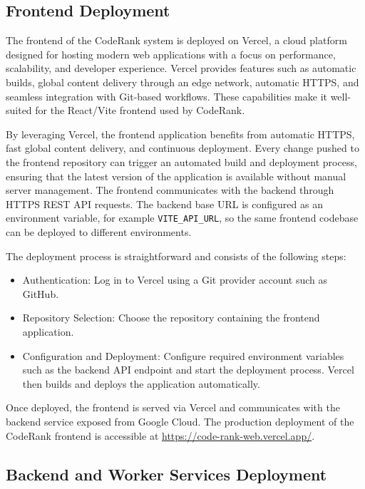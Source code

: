 \subsection{Frontend Deployment}

The frontend of the CodeRank system is deployed on Vercel, a cloud platform designed for hosting modern web applications with a focus on performance, scalability, and developer experience. Vercel provides features such as automatic builds, global content delivery through an edge network, automatic HTTPS, and seamless integration with Git-based workflows. These capabilities make it well-suited for the React/Vite frontend used by CodeRank.

By leveraging Vercel, the frontend application benefits from automatic HTTPS, fast global content delivery, and continuous deployment. Every change pushed to the frontend repository can trigger an automated build and deployment process, ensuring that the latest version of the application is available without manual server management. The frontend communicates with the backend through HTTPS REST API requests. The backend base URL is configured as an environment variable, for example \texttt{VITE\_API\_URL}, so the same frontend codebase can be deployed to different environments.

The deployment process is straightforward and consists of the following steps:

\begin{itemize}
  \item Authentication: Log in to Vercel using a Git provider account such as GitHub.
  \item Repository Selection: Choose the repository containing the frontend application.
  \item Configuration and Deployment: Configure required environment variables such as the backend API endpoint and start the deployment process. Vercel then builds and deploys the application automatically.
\end{itemize}

Once deployed, the frontend is served via Vercel and communicates with the backend service exposed from Google Cloud. The production deployment of the CodeRank frontend is accessible at \url{https://code-rank-web.vercel.app/}.

\subsection{Backend and Worker Services Deployment}


